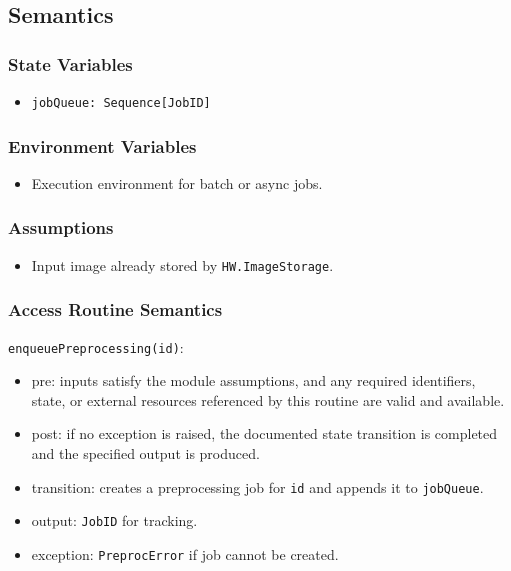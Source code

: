 \documentclass[12pt, titlepage]{article}
\begin{document}
\subsection{Semantics}

\subsubsection{State Variables}
\begin{itemize}
    \item \texttt{jobQueue: Sequence[JobID]}
\end{itemize}

\subsubsection{Environment Variables}
\begin{itemize}
    \item Execution environment for batch or async jobs.
\end{itemize}

\subsubsection{Assumptions}
\begin{itemize}
    \item Input image already stored by \texttt{HW.ImageStorage}.
\end{itemize}

\subsubsection{Access Routine Semantics}

\noindent \texttt{enqueuePreprocessing(id)}:
\begin{itemize}
    \item pre: inputs satisfy the module assumptions, and any required identifiers, state, or external resources referenced by this routine are valid and available.
    \item post: if no exception is raised, the documented state transition is completed and the specified output is produced.
    \item transition: creates a preprocessing job for \texttt{id} and appends it to \texttt{jobQueue}.
    \item output: \texttt{JobID} for tracking.
    \item exception: \texttt{PreprocError} if job cannot be created.
\end{itemize}
\end{document}
